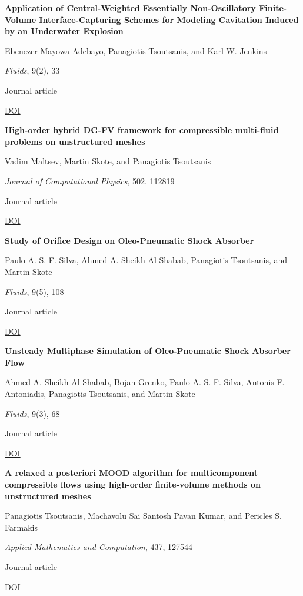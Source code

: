 \documentclass[11pt,a4paper]{article}
\newlength{\cventrysep}
\newenvironment{cventry}{%
  \par\noindent\begin{minipage}{\linewidth}
  \RaggedRight\fontsize{9.8}{12.5}\selectfont
}{\end{minipage}\par\addvspace{\cventrysep}}
\newcommand{\cvtitle}[1]{{\bfseries #1\par}\vspace{1pt}}
\newcommand{\cvdetail}[1]{{#1\par}\vspace{1pt}}
\newcommand{\cvmeta}[1]{{\fontsize{9}{11.5}\selectfont\color{Muted}#1\par}\vspace{1pt}}
\newcommand{\cvlinks}[1]{{\fontsize{9}{11.5}\selectfont #1\par}}
\newcommand{\cvyear}[1]{{\color{Teal}\bfseries\fontsize{11}{13}\selectfont #1\par}\vspace{6pt}}
\begin{document}
\begin{cventry}
\cvtitle{Application of Central-Weighted Essentially Non-Oscillatory Finite-Volume Interface-Capturing Schemes for Modeling Cavitation Induced by an Underwater Explosion}
\cvdetail{Ebenezer Mayowa Adebayo, Panagiotis Tsoutsanis, and Karl W. Jenkins}
\cvmeta{\textit{Fluids}, 9(2), 33\par Journal article}
\cvlinks{\href{https://doi.org/10.3390/fluids9020033}{DOI}}
\end{cventry}

\begin{cventry}
\cvtitle{High-order hybrid DG-FV framework for compressible multi-fluid problems on unstructured meshes}
\cvdetail{Vadim Maltsev, Martin Skote, and Panagiotis Tsoutsanis}
\cvmeta{\textit{Journal of Computational Physics}, 502, 112819\par Journal article}
\cvlinks{\href{https://doi.org/10.1016/j.jcp.2024.112819}{DOI}}
\end{cventry}

\begin{cventry}
\cvtitle{Study of Orifice Design on Oleo-Pneumatic Shock Absorber}
\cvdetail{Paulo A. S. F. Silva, Ahmed A. Sheikh Al-Shabab, Panagiotis Tsoutsanis, and Martin Skote}
\cvmeta{\textit{Fluids}, 9(5), 108\par Journal article}
\cvlinks{\href{https://doi.org/10.3390/fluids9050108}{DOI}}
\end{cventry}

\begin{cventry}
\cvtitle{Unsteady Multiphase Simulation of Oleo-Pneumatic Shock Absorber Flow}
\cvdetail{Ahmed A. Sheikh Al-Shabab, Bojan Grenko, Paulo A. S. F. Silva, Antonis F. Antoniadis, Panagiotis Tsoutsanis, and Martin Skote}
\cvmeta{\textit{Fluids}, 9(3), 68\par Journal article}
\cvlinks{\href{https://doi.org/10.3390/fluids9030068}{DOI}}
\end{cventry}

\begin{cventry}
\cvyear{2023}
\cvtitle{A relaxed a posteriori MOOD algorithm for multicomponent compressible flows using high-order finite-volume methods on unstructured meshes}
\cvdetail{Panagiotis Tsoutsanis, Machavolu Sai Santosh Pavan Kumar, and Pericles S. Farmakis}
\cvmeta{\textit{Applied Mathematics and Computation}, 437, 127544\par Journal article}
\cvlinks{\href{https://doi.org/10.1016/j.amc.2022.127544}{DOI}}
\end{cventry}
\end{document}
